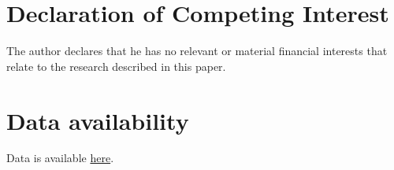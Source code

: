 \documentclass[a4paper,fleqn]{cas-sc}
\begin{document}
\section*{Declaration of Competing Interest}
The author declares that he has no relevant or material financial interests that relate to the research described in this paper.

\section*{Data availability}

Data is available \href{https://github.com/hhadah/hispanic-last-names/tree/main/data/datasets}{here}.

\newpage
\clearpage



\newpage
\clearpage


\newpage
\clearpage



\newpage
\clearpage



\newpage
\clearpage


\end{document}
